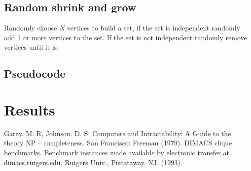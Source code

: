 \documentclass[conference]{IEEEtran}
\begin{document}
\subsection{Random shrink and grow}

Randomly choose $N$ vertices to build a set, if the set is independent randomly add 1 or more vertices to the set.
If the set is not independent randomly remove vertices until it is.

\subsection{Pseudocode}

\section{Results}

\begin{thebibliography}{00}
  Garey. M. R, Johnson. D. S: Computers and Intractability: A Guide to the theory NP – completeness. San Francisco: Freeman (1979).  
 DIMACS clique benchmarks. Benchmark instances made available by electronic transfer at dimacs.rutgers.edu, Rutgers Univ., Piscataway. NJ. (1993). 
\end{thebibliography}
\end{document}
